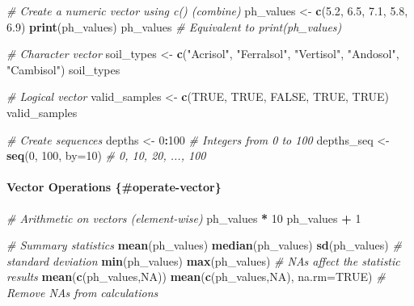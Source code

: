 \documentclass[
  10pt,
  b5paper,
  oneside]{book}
\newenvironment{Shaded}{\begin{snugshade}}{\end{snugshade}}
\newcommand{\AttributeTok}[1]{\textcolor[rgb]{0.13,0.29,0.53}{#1}}
\newcommand{\CommentTok}[1]{\textcolor[rgb]{0.56,0.35,0.01}{\textit{#1}}}
\newcommand{\ConstantTok}[1]{\textcolor[rgb]{0.56,0.35,0.01}{#1}}
\newcommand{\DecValTok}[1]{\textcolor[rgb]{0.00,0.00,0.81}{#1}}
\newcommand{\FloatTok}[1]{\textcolor[rgb]{0.00,0.00,0.81}{#1}}
\newcommand{\FunctionTok}[1]{\textcolor[rgb]{0.13,0.29,0.53}{\textbf{#1}}}
\newcommand{\NormalTok}[1]{#1}
\newcommand{\OtherTok}[1]{\textcolor[rgb]{0.56,0.35,0.01}{#1}}
\newcommand{\SpecialCharTok}[1]{\textcolor[rgb]{0.81,0.36,0.00}{\textbf{#1}}}
\newcommand{\StringTok}[1]{\textcolor[rgb]{0.31,0.60,0.02}{#1}}
\begin{document}
\begin{Shaded}
\begin{Highlighting}[]
\CommentTok{\# Create a numeric vector using c() (combine)}
\NormalTok{ph\_values }\OtherTok{\textless{}{-}} \FunctionTok{c}\NormalTok{(}\FloatTok{5.2}\NormalTok{, }\FloatTok{6.5}\NormalTok{, }\FloatTok{7.1}\NormalTok{, }\FloatTok{5.8}\NormalTok{, }\FloatTok{6.9}\NormalTok{)}
\FunctionTok{print}\NormalTok{(ph\_values)}
\NormalTok{ph\_values }\CommentTok{\# Equivalent to print(ph\_values)}

\CommentTok{\# Character vector}
\NormalTok{soil\_types }\OtherTok{\textless{}{-}} \FunctionTok{c}\NormalTok{(}\StringTok{"Acrisol"}\NormalTok{, }\StringTok{"Ferralsol"}\NormalTok{, }\StringTok{"Vertisol"}\NormalTok{, }\StringTok{"Andosol"}\NormalTok{, }\StringTok{"Cambisol"}\NormalTok{)}
\NormalTok{soil\_types}

\CommentTok{\# Logical vector}
\NormalTok{valid\_samples }\OtherTok{\textless{}{-}} \FunctionTok{c}\NormalTok{(}\ConstantTok{TRUE}\NormalTok{, }\ConstantTok{TRUE}\NormalTok{, }\ConstantTok{FALSE}\NormalTok{, }\ConstantTok{TRUE}\NormalTok{, }\ConstantTok{TRUE}\NormalTok{)}
\NormalTok{valid\_samples}

\CommentTok{\# Create sequences}
\NormalTok{depths }\OtherTok{\textless{}{-}} \DecValTok{0}\SpecialCharTok{:}\DecValTok{100}                    \CommentTok{\# Integers from 0 to 100}
\NormalTok{depths\_seq }\OtherTok{\textless{}{-}} \FunctionTok{seq}\NormalTok{(}\DecValTok{0}\NormalTok{, }\DecValTok{100}\NormalTok{, }\AttributeTok{by=}\DecValTok{10}\NormalTok{)   }\CommentTok{\# 0, 10, 20, ..., 100}
\end{Highlighting}
\end{Shaded}

\paragraph*{Vector Operations \{\#operate-vector\}}\label{vector-operations-operate-vector}

\begin{Shaded}
\begin{Highlighting}[]
\CommentTok{\# Arithmetic on vectors (element{-}wise)}
\NormalTok{ph\_values }\SpecialCharTok{*} \DecValTok{10}
\NormalTok{ph\_values }\SpecialCharTok{+} \DecValTok{1}

\CommentTok{\# Summary statistics}
\FunctionTok{mean}\NormalTok{(ph\_values)}
\FunctionTok{median}\NormalTok{(ph\_values)}
\FunctionTok{sd}\NormalTok{(ph\_values)        }\CommentTok{\# standard deviation}
\FunctionTok{min}\NormalTok{(ph\_values)}
\FunctionTok{max}\NormalTok{(ph\_values)}
\CommentTok{\# NAs affect the statistic results}
\FunctionTok{mean}\NormalTok{(}\FunctionTok{c}\NormalTok{(ph\_values,}\ConstantTok{NA}\NormalTok{))}
\FunctionTok{mean}\NormalTok{(}\FunctionTok{c}\NormalTok{(ph\_values,}\ConstantTok{NA}\NormalTok{), }\AttributeTok{na.rm=}\ConstantTok{TRUE}\NormalTok{) }\CommentTok{\# Remove NAs from calculations}
\end{Highlighting}
\end{Shaded}
\end{document}
